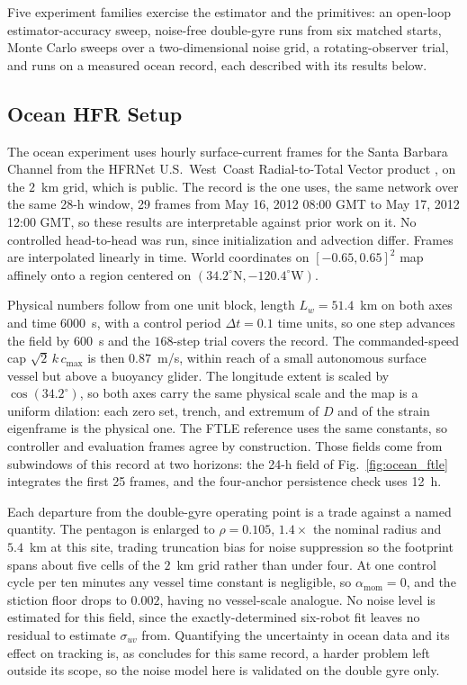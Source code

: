 \documentclass[lettersize,journal]{IEEEtran}
\begin{document}
Five experiment families exercise the estimator and the primitives: an
open-loop estimator-accuracy sweep, noise-free double-gyre runs from six
matched starts, Monte Carlo sweeps over a two-dimensional noise grid, a
rotating-observer trial, and runs on a measured ocean record, each
described with its results below.

\subsection{Ocean HFR Setup}
\label{sec:ocean_sim}

The ocean experiment uses hourly surface-current frames for the Santa
Barbara Channel from the HFRNet U.S.~West~Coast Radial-to-Total Vector
product \cite{35}, on the $2$~km grid, which is public. The record is the one \cite{26} uses, the same network over the same 28-h window, 29 frames from May 16, 2012 08:00 GMT to May 17, 2012 12:00 GMT, so these results are interpretable against prior work on it. No controlled head-to-head was run, since initialization and advection differ.
Frames are interpolated linearly in time. World
coordinates on $[-0.65, 0.65]^2$ map affinely onto a region centered on
$(34.2^{\circ}\mathrm{N}, -120.4^{\circ}\mathrm{W})$.

Physical numbers follow from one unit block, length $L_w = 51.4$~km on
both axes and time $6000$~s, with a control period $\Delta t = 0.1$
time units, so one step advances the field by $600$~s and the
$168$-step trial covers the record. The commanded-speed cap
$\sqrt{2}\,k\,c_{\max}$ is then $0.87$~m/s, within reach of a small
autonomous surface vessel but above a buoyancy glider. The longitude
extent is
scaled by $\cos(34.2^{\circ})$, so both axes carry the same physical
scale and the map is a uniform dilation: each zero set, trench, and
extremum of $D$ and of the strain eigenframe is the physical one. The
FTLE reference uses the same constants, so controller and evaluation
frames agree by construction. Those fields come from subwindows of this record at two
horizons: the 24-h field of Fig.~\ref{fig:ocean_ftle} integrates the
first 25 frames, and the four-anchor persistence check uses 12~h.

Each departure from the double-gyre operating point is a trade against a
named quantity. The pentagon is
enlarged to $\rho = 0.105$, $1.4\times$ the nominal radius and $5.4$~km
at this site, trading truncation bias for noise suppression so the
footprint spans about five cells of the $2$~km grid rather
than under four. At one control cycle per ten minutes any vessel time
constant is negligible, so $\alpha_{\text{mom}} = 0$, and the stiction
floor drops to $0.002$, having no vessel-scale analogue. No noise level is estimated for this field, since the exactly-determined six-robot fit leaves no residual to estimate $\sigma_{uv}$ from. Quantifying the uncertainty in ocean data and its effect on tracking is, as \cite{26} concludes for this same record, a harder problem left outside its scope, so the noise model here is validated on the double gyre only.
\end{document}

